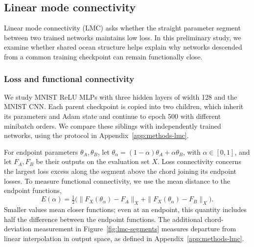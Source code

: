 \subsection{Linear mode connectivity}
\label{app:lmc}
Linear mode connectivity (LMC) asks whether the straight parameter segment between two trained networks maintains low loss. In this preliminary study, we examine whether shared ocean structure helps explain why networks descended from a common training checkpoint can remain functionally close.

\subsubsection{Loss and functional connectivity}
We study MNIST ReLU MLPs with three hidden layers of width 128 and the MNIST CNN. Each parent checkpoint is copied into two children, which inherit its parameters and Adam state and continue to epoch 500 with different minibatch orders. We compare these siblings with independently trained networks, using the protocol in Appendix~\ref{app:methods-lmc}.

For endpoint parameters $\theta_A,\theta_B$, let $\theta_\alpha=(1-\alpha)\theta_A+\alpha\theta_B$, with $\alpha\in[0,1]$, and let $F_A,F_B$ be their outputs on the evaluation set $X$. Loss connectivity concerns the largest loss excess along the segment above the chord joining its endpoint losses. To measure functional connectivity, we use the mean distance to the endpoint functions,
\[
 E(\alpha)=\tfrac12\bigl(\|F_X(\theta_\alpha)-F_A\|_X+
 \|F_X(\theta_\alpha)-F_B\|_X\bigr).
\]
Smaller values mean closer functions; even at an endpoint, this quantity includes half the difference between the endpoint functions. The additional chord-deviation measurement in Figure~\ref{fig:lmc-segments} measures departure from linear interpolation in output space, as defined in Appendix~\ref{app:methods-lmc}.

